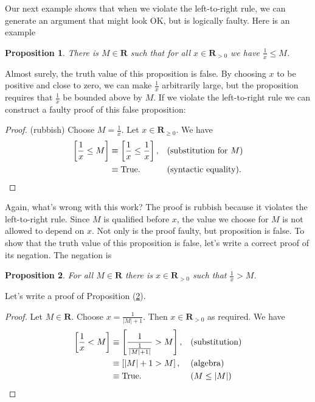 \documentclass[12pt,fleqn]{article}
\newcommand{\reals}{\mathbf{R}}
\newcommand{\true}{\mathrm{True}}
\newenvironment{myproof}
  {\begin{shaded}\begin{proof}}
  {\end{proof}\end{shaded}}
\newtheorem{prop}{Proposition}
\begin{document}
Our next example  shows that when we violate the left-to-right rule, we can generate an  argument that might look OK, but 
is logically faulty.  Here is an example

\begin{prop} There is $M \in \reals$ such that for all $x \in \reals_{>0}$ we have  $\frac{1}{x} \leq M$.  
\end{prop}

Almost surely, the truth value of this proposition is false. By choosing $x$ to be positive and close to zero,  we can make $\frac{1}{x}$ 
arbitrarily large, but the proposition requires that  $\frac{1}{x}$   be bounded above by $M$. If we violate the left-to-right rule
we can construct a faulty proof of this false proposition:

\begin{myproof} (rubbish) Choose $M = \frac{1}{x}$. Let  $x \in \reals_{\geq 0}$. We have
\begin{align*}
 \left[\frac{1}{x}  \leq M  \right] &\equiv
 \left[\frac{1}{x}  \leq  \frac{1}{x}  \right],  &&\mbox{(substitution for $M$)} \\
 &\equiv \mbox{True}. &&\mbox{(syntactic equality)}.   \qedhere
\end{align*}
\end{myproof}
\noindent Again, what's wrong with this work?   The proof is rubbish because it violates  the left-to-right rule.  Since $M$ is qualified before $x$,
  the value we choose for $M$ is not allowed to depend on $x$. Not only is the proof faulty, but proposition is false.  To show that the 
  truth value of this proposition is false, let's write a correct proof of its negation.  The negation  is 

\begin{prop} For all $M \in \reals$  there is $x \in \reals_{>0}$ such that $\frac{1}{x} >  M$.  \label{px14} \end{prop}

Let's write a proof of  Proposition (\ref{px14}).

\begin{myproof} Let $M \in \reals$.  Choose $x  = \frac{1}{|M| + 1 }$. Then  $x \in \reals_{>0}$ as required.  We have
\begin{align*}
  \left [ \frac{1}{x} < M \right] &\equiv \left[  \frac{1}{\frac{1}{|M| + 1|} } > M   \right], &&\text{(substitution)} \\
                                                      &\equiv \left[|M| + 1 > M \right], &&\text{(algebra)} \\
                                                      &\equiv \true.  &&( M \leq |M|) \qedhere
\end{align*}
\end{myproof}                                   
\end{document}
